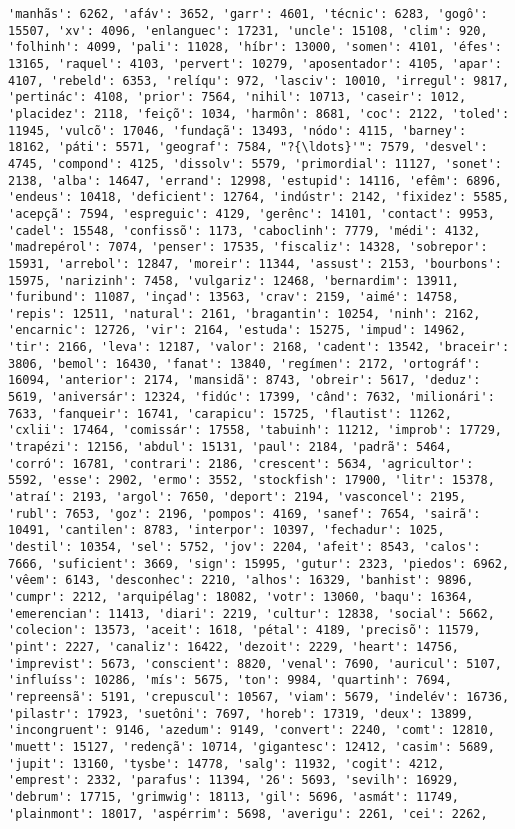 \documentclass[11pt]{article}
\begin{document}
\begin{Verbatim}[commandchars=\\\{\}]
'manhãs': 6262, 'afáv': 3652, 'garr': 4601, 'técnic': 6283, 'gogô': 15507, 'xv': 4096, 'enlanguec': 17231, 'uncle': 15108, 'clim': 920, 'folhinh': 4099, 'pali': 11028, 'híbr': 13000, 'somen': 4101, 'éfes': 13165, 'raquel': 4103, 'pervert': 10279, 'aposentador': 4105, 'apar': 4107, 'rebeld': 6353, 'relíqu': 972, 'lasciv': 10010, 'irregul': 9817, 'pertinác': 4108, 'prior': 7564, 'nihil': 10713, 'caseir': 1012, 'placidez': 2118, 'feiçõ': 1034, 'harmôn': 8681, 'coc': 2122, 'toled': 11945, 'vulcõ': 17046, 'fundaçã': 13493, 'nódo': 4115, 'barney': 18162, 'páti': 5571, 'geograf': 7584, "?{\ldots}'": 7579, 'desvel': 4745, 'compond': 4125, 'dissolv': 5579, 'primordial': 11127, 'sonet': 2138, 'alba': 14647, 'errand': 12998, 'estupid': 14116, 'efêm': 6896, 'endeus': 10418, 'deficient': 12764, 'indústr': 2142, 'fixidez': 5585, 'acepçã': 7594, 'espreguic': 4129, 'gerênc': 14101, 'contact': 9953, 'cadel': 15548, 'confissõ': 1173, 'caboclinh': 7779, 'médi': 4132, 'madrepérol': 7074, 'penser': 17535, 'fiscaliz': 14328, 'sobrepor': 15931, 'arrebol': 12847, 'moreir': 11344, 'assust': 2153, 'bourbons': 15975, 'narizinh': 7458, 'vulgariz': 12468, 'bernardim': 13911, 'furibund': 11087, 'inçad': 13563, 'crav': 2159, 'aimé': 14758, 'repis': 12511, 'natural': 2161, 'bragantin': 10254, 'ninh': 2162, 'encarnic': 12726, 'vir': 2164, 'estuda': 15275, 'impud': 14962, 'tir': 2166, 'leva': 12187, 'valor': 2168, 'cadent': 13542, 'braceir': 3806, 'bemol': 16430, 'fanat': 13840, 'regímen': 2172, 'ortográf': 16094, 'anterior': 2174, 'mansidã': 8743, 'obreir': 5617, 'deduz': 5619, 'aniversár': 12324, 'fidúc': 17399, 'când': 7632, 'milionári': 7633, 'fanqueir': 16741, 'carapicu': 15725, 'flautist': 11262, 'cxlii': 17464, 'comissár': 17558, 'tabuinh': 11212, 'improb': 17729, 'trapézi': 12156, 'abdul': 15131, 'paul': 2184, 'padrã': 5464, 'corró': 16781, 'contrari': 2186, 'crescent': 5634, 'agricultor': 5592, 'esse': 2902, 'ermo': 3552, 'stockfish': 17900, 'litr': 15378, 'atraí': 2193, 'argol': 7650, 'deport': 2194, 'vasconcel': 2195, 'rubl': 7653, 'goz': 2196, 'pompos': 4169, 'sanef': 7654, 'sairã': 10491, 'cantilen': 8783, 'interpor': 10397, 'fechadur': 1025, 'destil': 10354, 'sel': 5752, 'jov': 2204, 'afeit': 8543, 'calos': 7666, 'suficient': 3669, 'sign': 15995, 'gutur': 2323, 'piedos': 6962, 'vêem': 6143, 'desconhec': 2210, 'alhos': 16329, 'banhist': 9896, 'cumpr': 2212, 'arquipélag': 18082, 'votr': 13060, 'baqu': 16364, 'emerencian': 11413, 'diari': 2219, 'cultur': 12838, 'social': 5662, 'colecion': 13573, 'aceit': 1618, 'pétal': 4189, 'precisõ': 11579, 'pint': 2227, 'canaliz': 16422, 'dezoit': 2229, 'heart': 14756, 'imprevist': 5673, 'conscient': 8820, 'venal': 7690, 'auricul': 5107, 'influíss': 10286, 'mís': 5675, 'ton': 9984, 'quartinh': 7694, 'repreensã': 5191, 'crepuscul': 10567, 'viam': 5679, 'indelév': 16736, 'pilastr': 17923, 'suetôni': 7697, 'horeb': 17319, 'deux': 13899, 'incongruent': 9146, 'azedum': 9149, 'convert': 2240, 'comt': 12810, 'muett': 15127, 'redençã': 10714, 'gigantesc': 12412, 'casim': 5689, 'jupit': 13160, 'tysbe': 14778, 'salg': 11932, 'cogit': 4212, 'emprest': 2332, 'parafus': 11394, '26': 5693, 'sevilh': 16929, 'debrum': 17715, 'grimwig': 18113, 'gil': 5696, 'asmát': 11749, 'plainmont': 18017, 'aspérrim': 5698, 'averigu': 2261, 'cei': 2262, 
\end{Verbatim}
\end{document}
